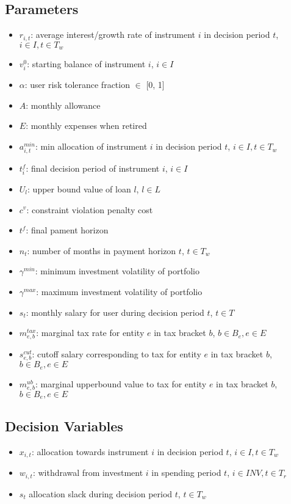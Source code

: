 \documentclass[11pt]{article}
\begin{document}
\subsection{Parameters}
\begin{itemize}
    \item $r_{i, t}$: average interest/growth rate of instrument $i$ in decision period $t$, $i \in I, t \in T_w$
    \item $v^{0}_{i}$: starting balance of instrument $i$, $i \in I$
    \item $\alpha$: user risk tolerance fraction $\in$ [0, 1]
    \item $A$: monthly allowance
    \item $E$: monthly expenses when retired
    \item $a^{min}_{i, t}$: min allocation of instrument $i$ in decision period $t$, $i \in I, t \in T_w$
    \item $t^{f}_{i}$: final decision period of instrument $i$, $i \in I$
    \item ${U}_{l}$: upper bound value of loan $l$, $l \in L$
    \item $c^{v}$: constraint violation penalty cost
    \item $t^{f}$: final pament horizon
    \item $n_{t}$: number of months in payment horizon $t$, $t \in T_w$
    \item $\gamma^{min}$: minimum investment volatility of portfolio
    \item $\gamma^{max}$: maximum investment volatility of portfolio
    \item $s_{t}$: monthly salary for user during decision period $t$, $t \in T$
    \item $m^{tax}_{e, b}$: marginal tax rate for entity $e$ in tax bracket $b$, $b \in B_e, e \in E$
    \item $s^{cut}_{e, b}$: cutoff salary corresponding to tax for entity $e$ in tax bracket $b$, $b \in B_e, e \in E$
    \item $m^{ub}_{e, b}$: marginal upperbound value to tax for entity $e$ in tax bracket $b$, $b \in B_e, e \in E$
\end{itemize}

\subsection{Decision Variables}
\begin{itemize}
    \item $x_{i, t}$: allocation towards instrument $i$ in decision period $t$, $i \in I, t \in T_w$
    \item $w_{i, t}$: withdrawal from investment $i$ in spending period $t$, $i \in INV, t \in T_r$
    \item $s_{t}$ allocation slack during decision period $t$, $t \in T_w$
\end{itemize}
\end{document}
